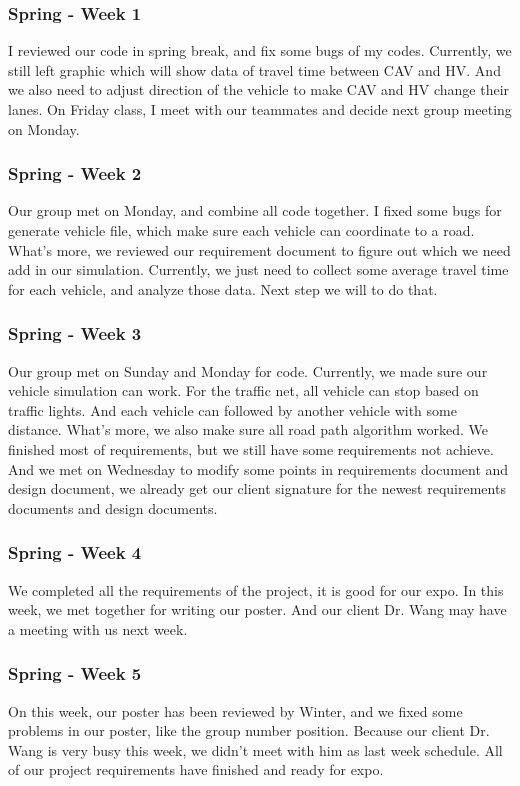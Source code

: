 \documentclass[onecolumn, draftclsnofoot,10pt, compsoc]{IEEEtran}
\begin{document}
\subsubsection{Spring - Week 1}
I reviewed our code in spring break, and fix some bugs of my codes.
Currently, we still left graphic which will show data of travel time between CAV and HV.
And we also need to adjust direction of the vehicle to make CAV and HV change their lanes.
On Friday class, I meet with our teammates and decide next group meeting on Monday.
\subsubsection{Spring - Week 2}
Our group met on Monday, and combine all code together.
I fixed some bugs for generate vehicle file, which make sure each vehicle can coordinate to a road.
What's more, we reviewed our requirement document to figure out which we need add in our simulation.
Currently, we just need to collect some average travel time for each vehicle, and analyze those data.
Next step we will to do that.
\subsubsection{Spring - Week 3}
Our group met on Sunday and Monday for code.
Currently, we made sure our vehicle simulation can work.
For the traffic net, all vehicle can stop based on traffic lights.
And each vehicle can followed by another vehicle with some distance.
What's more, we also make sure all road path algorithm worked.
We finished most of requirements, but we still have some requirements not achieve.
And we met on Wednesday to modify some points in requirements document and design document, we already get our client signature for the newest requirements documents and design documents.
\subsubsection{Spring - Week 4}
We completed all the requirements of the project, it is good for our expo.
In this week, we met together for writing our poster.
And our client Dr. Wang may have a meeting with us next week.
\subsubsection{Spring - Week 5}
On this week, our poster has been reviewed by Winter, and we fixed some problems in our poster, like the group number position.
Because our client Dr. Wang is very busy this week, we didn't meet with him as last week schedule.
All of our project requirements have finished and ready for expo.
\end{document}
